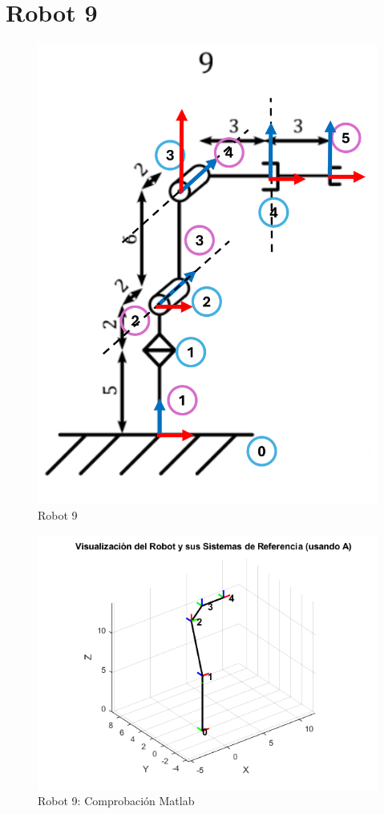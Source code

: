 \section{Robot 9}
\begin{figure}[h]
	\centering
	{%
	\includegraphics[width=0.5\linewidth]{img/Robot9_1}
	\caption{Robot 9}
	\label{fig:robot91}
	}
\end{figure}
\begin{figure}[h]
	\centering
	{%
	\includegraphics[width=0.7\linewidth]{img/Robot9}
	\caption{Robot 9: Comprobación Matlab}
	\label{fig:robot9}
	}
\end{figure}

